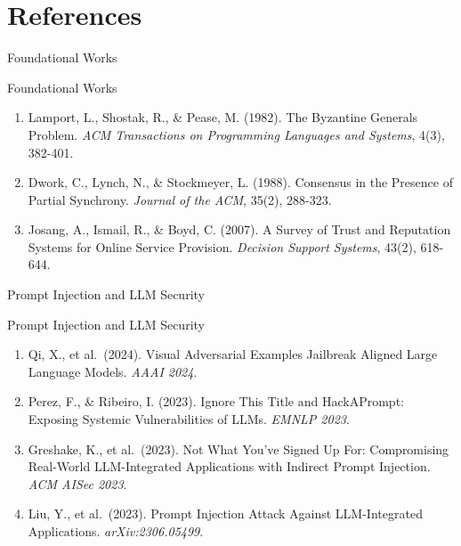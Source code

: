\documentclass[
  ignorenonframetext,
]{beamer}
\author{\texorpdfstring{}{}}
\date{}
\begin{document}
\begin{frame}
\newpage
\end{frame}

\section{References}\label{sec:references}

\begin{frame}[allowframebreaks]{Foundational Works}
\protect{}\label{foundational-works}
\end{frame}

\begin{frame}[allowframebreaks]{Foundational Works}
\begin{enumerate}
\item
  Lamport, L., Shostak, R., \& Pease, M. (1982). The Byzantine Generals
  Problem. \emph{ACM Transactions on Programming Languages and Systems},
  4(3), 382-401.
\item
  Dwork, C., Lynch, N., \& Stockmeyer, L. (1988). Consensus in the
  Presence of Partial Synchrony. \emph{Journal of the ACM}, 35(2),
  288-323.
\item
  Josang, A., Ismail, R., \& Boyd, C. (2007). A Survey of Trust and
  Reputation Systems for Online Service Provision. \emph{Decision
  Support Systems}, 43(2), 618-644.
\end{enumerate}
\end{frame}

\begin{frame}[allowframebreaks]{Prompt Injection and LLM Security}
\protect{}\label{prompt-injection-and-llm-security}
\end{frame}

\begin{frame}[allowframebreaks]{Prompt Injection and LLM Security}
\begin{enumerate}
\item
  Qi, X., et al.~(2024). Visual Adversarial Examples Jailbreak Aligned
  Large Language Models. \emph{AAAI 2024}.
\item
  Perez, F., \& Ribeiro, I. (2023). Ignore This Title and HackAPrompt:
  Exposing Systemic Vulnerabilities of LLMs. \emph{EMNLP 2023}.
\item
  Greshake, K., et al.~(2023). Not What You've Signed Up For:
  Compromising Real-World LLM-Integrated Applications with Indirect
  Prompt Injection. \emph{ACM AISec 2023}.
\item
  Liu, Y., et al.~(2023). Prompt Injection Attack Against LLM-Integrated
  Applications. \emph{arXiv:2306.05499}.
\end{enumerate}
\end{frame}
\end{document}
